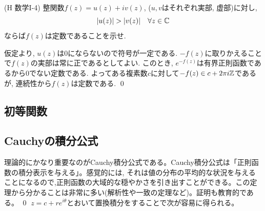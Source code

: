 \begin{egprob} (H 数学I-4)
整関数$f(z)=u(z) + iv(z)$, ($u,v$はそれぞれ実部, 虚部)に対し,
\[|u(z)| > |v(z)|\quad \forall z\in \mathbb{C}\]
ならば$f(z)$は定数であることを示せ.
\end{egprob}

\begin{egans}
仮定より, $u(z)$は0にならないので符号が一定である. $-f(z)$に取りかえることで$f(z)$の実部は常に正であるとしてよい. このとき, $e^{-f(z)}$は有界正則函数であるから0でない定数である. よってある複素数$c$に対して$-f(z)\in c + 2\pi i \mathbb{Z} $であるが, 連続性から$f(z)$は定数である. \qed
\end{egans}




\subsection{初等関数}





\newpage
\subsection{Cauchyの積分公式}
理論的にかなり重要なのがCauchy積分公式である。Cauchy積分公式は「正則函数の積分表示を与える」。感覚的には, それは値の分布の平均的な状況を与えることになるので,正則函数の大域的な穏やかさを引き出すことができる。この定理から分かることは非常に多い(解析性や一致の定理など)。証明も教育的である。
\prf
\qed
$z=c+re^{i\theta}$とおいて置換積分をすることで次が容易に得られる。

